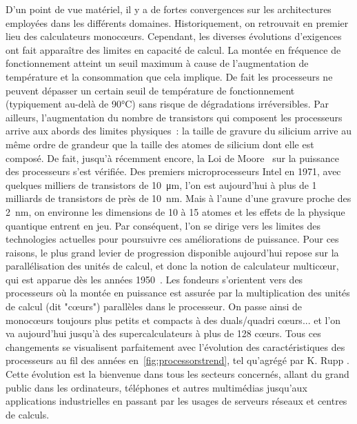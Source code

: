 \documentclass[french, a4paper, 11pt, twoside, pdftex]{StyleThese}
\begin{document}
		D'un point de vue matériel, il y a de fortes convergences sur les architectures employées dans les différents domaines. Historiquement, on retrouvait en premier lieu des calculateurs monocœurs. Cependant, les diverses évolutions d'exigences ont fait apparaître des limites en capacité de calcul. La montée en fréquence de fonctionnement atteint un seuil maximum à cause de l'augmentation de température et la consommation que cela implique. De fait les processeurs ne peuvent dépasser un certain seuil de température de fonctionnement (typiquement au-delà de 90°C) sans risque de dégradations irréversibles. Par ailleurs, l'augmentation du nombre de transistors qui composent les processeurs arrive aux abords des limites physiques~: la taille de gravure du silicium arrive au même ordre de grandeur que la taille des atomes de silicium dont elle est composé. De fait, jusqu'à récemment encore, la Loi de Moore~\cite{thompson_moores_2006} sur la puissance des processeurs s'est vérifiée. Des premiers microprocesseurs Intel en 1971, avec quelques milliers de transistors de \SI{10}{\micro\metre}, l'on est aujourd'hui à plus de 1 milliards de transistors de près de \SI{10}{\nano\metre}. Mais à l'aune d'une gravure proche des \SI{2}{\nano\metre}, on environne les dimensions de 10 à 15 atomes et les effets de la physique quantique entrent en jeu. Par conséquent, l'on se dirige vers les limites des technologies actuelles pour poursuivre ces améliorations de puissance. Pour ces raisons, le plus grand levier de progression disponible aujourd'hui repose sur la parallélisation des unités de calcul, et donc la notion de calculateur multicœur, qui est apparue dès les années 1950~\cite{smotherman_history_2005}. Les fondeurs s'orientent vers des processeurs où la montée en puissance est assurée par la multiplication des unités de calcul (dit "cœurs") parallèles dans le processeur. On passe ainsi de monocœurs toujours plus petits et compacts à des duals/quadri cœurs... et l'on va aujourd'hui jusqu'à des supercalculateurs à plus de 128 cœurs. Tous ces changements se visualisent parfaitement avec l'évolution des caractéristiques des processeurs au fil des années en~\autoref{fig:processorstrend}, tel qu'agrégé par K. Rupp \cite{rupp_42_2020}. Cette évolution est la bienvenue dans tous les secteurs concernés, allant du grand public dans les ordinateurs, téléphones et autres multimédias jusqu'aux applications industrielles en passant par les usages de serveurs réseaux et centres de calculs. %
\end{document}
